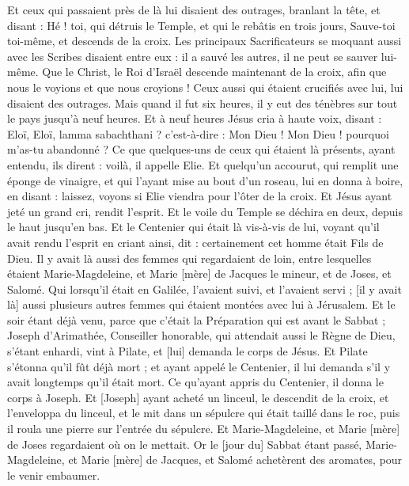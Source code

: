 \begin{multicols}{2}
Et ceux qui passaient près de là lui disaient des outrages, branlant la tête, et disant : Hé ! toi, qui détruis le Temple, et qui le rebâtis en trois jours,
Sauve-toi toi-même, et descends de la croix.
Les principaux Sacrificateurs se moquant aussi avec les Scribes disaient entre eux : il a sauvé les autres, il ne peut se sauver lui-même.
Que le Christ, le Roi d’Israël descende maintenant de la croix, afin que nous le voyions et que nous croyions ! Ceux aussi qui étaient crucifiés avec lui, lui disaient des outrages.
Mais quand il fut six heures, il y eut des ténèbres sur tout le pays jusqu'à neuf heures.
Et à neuf heures Jésus cria à haute voix, disant : Eloï, Eloï, lamma sabachthani ? c'est-à-dire : Mon Dieu ! Mon Dieu ! pourquoi m'as-tu abandonné ?
Ce que quelques-uns de ceux qui étaient là présents, ayant entendu, ils dirent : voilà, il appelle Elie.
Et quelqu'un accourut, qui remplit une éponge de vinaigre, et qui l'ayant mise au bout d'un roseau, lui en donna à boire, en disant : laissez, voyons si Elie viendra pour l'ôter de la croix.
Et Jésus ayant jeté un grand cri, rendit l'esprit.
Et le voile du Temple se déchira en deux, depuis le haut jusqu'en bas.
Et le Centenier qui était là vis-à-vis de lui, voyant qu'il avait rendu l'esprit en criant ainsi, dit : certainement cet homme était Fils de Dieu.
Il y avait là aussi des femmes qui regardaient de loin, entre lesquelles étaient Marie-Magdeleine, et Marie [mère] de Jacques le mineur, et de Joses, et Salomé.
Qui lorsqu'il était en Galilée, l'avaient suivi, et l'avaient servi ; [il y avait là] aussi plusieurs autres femmes qui étaient montées avec lui à Jérusalem.
Et le soir étant déjà venu, parce que c'était la Préparation qui est avant le Sabbat ;
Joseph d'Arimathée, Conseiller honorable, qui attendait aussi le Règne de Dieu, s'étant enhardi, vint à Pilate, et [lui] demanda le corps de Jésus.
Et Pilate s'étonna qu'il fût déjà mort ; et ayant appelé le Centenier, il lui demanda s'il y avait longtemps qu'il était mort.
Ce qu'ayant appris du Centenier, il donna le corps à Joseph.
Et [Joseph] ayant acheté un linceul, le descendit de la croix, et l'enveloppa du linceul, et le mit dans un sépulcre qui était taillé dans le roc, puis il roula une pierre sur l'entrée du sépulcre.
Et Marie-Magdeleine, et Marie [mère] de Joses regardaient où on le mettait.
\VerseOne{}Or le [jour du] Sabbat étant passé, Marie-Magdeleine, et Marie [mère] de Jacques, et Salomé achetèrent des aromates, pour le venir embaumer.

\end{multicols}
